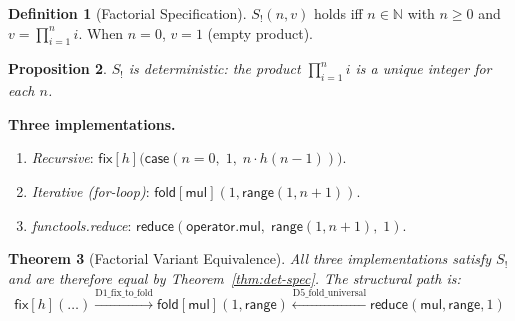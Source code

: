 \documentclass[11pt,a4paper]{report}
\theoremstyle{definition}
\newtheorem{definition}{Definition}[chapter]
\theoremstyle{plain}
\newtheorem{theorem}[definition]{Theorem}
\newtheorem{proposition}[definition]{Proposition}
\newcommand{\Nat}{\mathbb{N}}
\newcommand{\fold}{\mathsf{fold}}
\begin{document}
\begin{definition}[Factorial Specification]
$S_{!}(n, v)$ holds iff $n \in \Nat$ with $n \ge 0$ and
$v = \prod_{i=1}^{n} i$.  When $n = 0$, $v = 1$ (empty product).
\end{definition}

\begin{proposition}
$S_{!}$ is deterministic: the product $\prod_{i=1}^{n} i$ is a
unique integer for each $n$.
\end{proposition}

\noindent\textbf{Three implementations.}
\begin{enumerate}
  \item \emph{Recursive}:
    $\mathsf{fix}[h]\bigl(\mathsf{case}(n = 0,\; 1,\;
      n \cdot h(n-1))\bigr)$.
  \item \emph{Iterative (for-loop)}:
    $\fold[\mathsf{mul}](1, \mathsf{range}(1, n{+}1))$.
  \item \emph{functools.reduce}:
    $\mathsf{reduce}(\mathsf{operator.mul},\;
      \mathsf{range}(1, n{+}1),\; 1)$.
\end{enumerate}

\begin{theorem}[Factorial Variant Equivalence]
\label{thm:factorial-equiv}
All three implementations satisfy $S_{!}$ and are therefore
equal by Theorem~\ref{thm:det-spec}.  The structural path is:
\[
  \mathsf{fix}[h](\ldots) \xrightarrow{\text{D1\_fix\_to\_fold}}
  \fold[\mathsf{mul}](1, \mathsf{range})
  \xleftarrow{\text{D5\_fold\_universal}}
  \mathsf{reduce}(\mathsf{mul}, \mathsf{range}, 1)
\]
\end{theorem}
\end{document}
